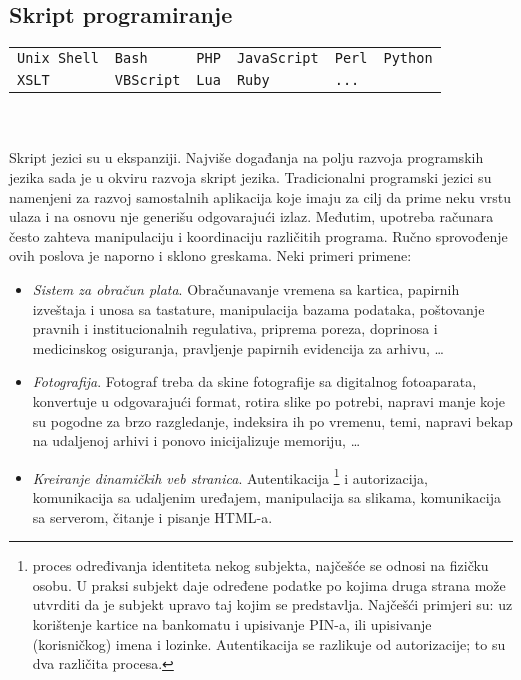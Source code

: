 \documentclass[../main.tex]{subfiles}
\begin{document}
\begin{boxnaslovi}
\section {Skript programiranje}											%
\end{boxnaslovi}

\begin{tabularx}{\textwidth}{XXXXXX}
	\texttt{Unix Shell} & \texttt{Bash} & \texttt{PHP} & \texttt{JavaScript} & \texttt{Perl} & \texttt{Python} \\
	\texttt{XSLT} & \texttt{VBScript} & \texttt{Lua} & \texttt{Ruby} & \texttt{...} &
\end{tabularx}
\\ \\
Skript jezici su u ekspanziji. Najviše događanja na polju razvoja programskih jezika sada je u okviru razvoja skript jezika. Tradicionalni programski jezici su namenjeni za razvoj samostalnih aplikacija koje imaju za cilj da prime neku vrstu ulaza i na osnovu nje generišu odgovarajući izlaz. Međutim, upotreba računara često zahteva manipulaciju i koordinaciju različitih programa. Ručno sprovođenje ovih poslova je naporno i sklono greskama. Neki primeri primene:
\begin{itemize}
	\item[1:] {\it Sistem za obračun plata}. Obračunavanje vremena sa kartica, papirnih izveštaja i unosa sa tastature, manipulacija bazama podataka, poštovanje pravnih i institucionalnih regulativa, priprema poreza, doprinosa i medicinskog osiguranja, pravljenje papirnih evidencija za arhivu, \ldots
	\item[2:] {\it Fotografija}. Fotograf treba da skine fotografije sa digitalnog fotoaparata, konvertuje u odgovarajući format, rotira slike po potrebi, napravi manje koje su pogodne za brzo razgledanje, indeksira ih po vremenu, temi, napravi bekap na udaljenoj arhivi i ponovo inicijalizuje memoriju, \ldots
	\item[3:] {\it Kreiranje dinamičkih veb stranica}. Autentikacija \footnote[1]{proces određivanja identiteta nekog subjekta, najčešće se odnosi na fizičku osobu. U praksi subjekt daje određene podatke po kojima druga strana može utvrditi da je subjekt upravo taj kojim se predstavlja. Najčešći primjeri su: uz korištenje kartice na bankomatu i upisivanje PIN-a, ili upisivanje (korisničkog) imena i lozinke. Autentikacija se razlikuje od autorizacije; to su dva različita procesa.} i autorizacija, komunikacija sa udaljenim uređajem, manipulacija sa slikama, komunikacija sa serverom, čitanje i pisanje HTML-a.
\end{itemize}
\end{document}
